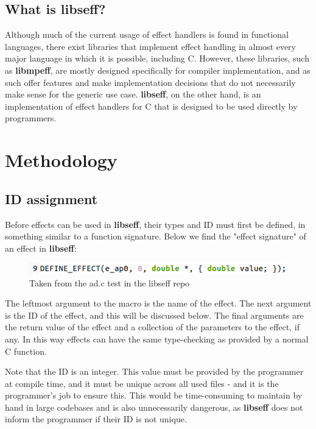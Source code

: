 \documentclass[logo,bsc,singlespacing,parskip,online]{infthesis}
\begin{document}
\section{What is libseff?}

Although much of the current usage of effect handlers is found in functional languages, there exist libraries that implement effect handling in almost every major language in which it is possible, including C. However, these libraries, such as \textbf{libmpeff}, are mostly designed specifically for compiler implementation, and as such offer features and make implementation decisions that do not necessarily make sense for the generic use case.\citep{libmprompt} \textbf{libseff}, on the other hand, is an implementation of effect handlers for C that is designed to be used directly by programmers.\citep{libseff_paper}








\chapter{Methodology} \label{method}

\section{ID assignment}

Before effects can be used in \textbf{libseff}, their types and ID must first be defined, in something similar to a function signature. Below we find the "effect signature" of an effect in \textbf{libseff}:

\begin{figure}[h]
    \centering
    \includegraphics[width=0.9\linewidth]{eff_def.png}
    \caption{Taken from the ad.c test in the libseff repo}
\end{figure}

The leftmost argument to the macro is the name of the effect. The next argument is the ID of the effect, and this will be discussed below. The final arguments are the return value of the effect and a collection of the parameters to the effect, if any. In this way effects can have the same type-checking as provided by a normal C function.

Note that the ID is an integer. This value must be provided by the programmer at compile time, and it must be unique across all used files - and it is the programmer's job to ensure this. This would be time-consuming to maintain by hand in large codebases and is also unnecessarily dangerous, as \textbf{libseff} does not inform the programmer if their ID is not unique.
\end{document}
